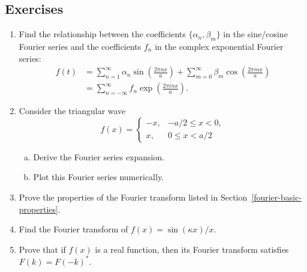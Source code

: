 \documentclass[10pt,a4paper]{article}
\begin{document}
\subsection{Exercises}\label{exercises}

\begin{enumerate}
\item
  Find the relationship between the coefficients
  $\{\alpha_n, \beta_m\}$ in the sine/cosine Fourier series and the
  coefficients $f_n$ in the complex exponential Fourier
  series:
  \begin{align}
    f(t) &= \sum_{n=1}^\infty \alpha_n \sin\left(\frac{2\pi n x}{a}\right) + \sum_{m=0}^\infty \beta_m \cos\left(\frac{2 \pi m x}{a}\right) \\
    &= \sum_{n=-\infty}^\infty f_n \exp\left(\frac{2\pi i n x}{a}\right).
  \end{align}

\item
  Consider the triangular wave
  \begin{equation}
    f(x) = \left\{\begin{array}{rr}- x, &-a/2 \le x < 0, \\
    x, & 0 \le x < a/2\end{array}\right.
  \end{equation}

  \begin{enumerate}[(a)]
  \item
    Derive the Fourier series expansion.

  \item
    Plot this Fourier series numerically.
  \end{enumerate}

\item
  Prove the properties of the Fourier transform listed in
  Section~\ref{fourier-basic-properties}.

\item
  Find the Fourier transform of $f(x) = \sin(\kappa x)/x.$

\item
  Prove that if $f(x)$ is a real function, then its Fourier transform
  satisfies $F(k) = F(-k)^*$.
\end{enumerate}
    
\end{document}
